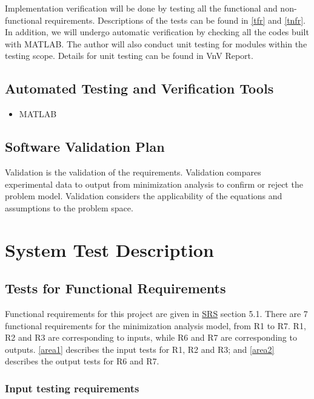 \documentclass[12pt, titlepage]{article}
\begin{document}
Implementation verification will be done by testing all the functional and non-functional requirements. Descriptions of the tests can be found in \autoref{tfr} and \autoref{tnfr}. 
In addition, we will undergo automatic verification by checking
all the codes built with MATLAB. The author will also conduct unit testing for modules
within the testing scope. Details for unit testing can be found in VnV Report.


\subsection{Automated Testing and Verification Tools}

\begin{itemize}
	\item MATLAB
\end{itemize}

\subsection{Software Validation Plan}

Validation is the validation of the requirements. Validation compares experimental data to output from minimization analysis to confirm or reject the problem model. Validation considers the applicability of the equations and assumptions to the problem space.


\section{System Test Description}
\label{systd}
	
\subsection{Tests for Functional Requirements}
\label{tfr}

Functional requirements for this project are given in 
\href{https://github.com/KarenKarenWang/cas741_project1/blob/main/docs/SRS/SRS.pdf}
{SRS} section 5.1. There are 7 functional requirements for the minimization analysis model, from R1 to R7.
R1, R2 and R3 are corresponding to inputs, while R6 and R7 are corresponding to outputs.
\autoref{area1} describes the input tests for R1, R2 and R3; and \autoref{area2} 
describes the output tests for R6 and R7.

\subsubsection{Input testing requirements}\label{Ainput}
\label{area1}
\end{document}
